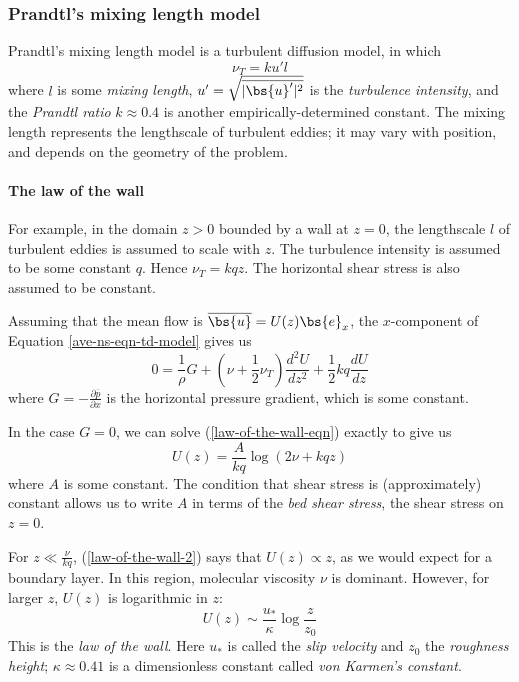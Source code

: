 \subsubsection{Prandtl's mixing length model}

Prandtl's mixing length model is a turbulent diffusion model, in which
\begin{equation}
    \nu_T = k u' l
\end{equation}
where $l$ is some \textit{mixing length}, $u'=\sqrt{\overline{|\bs{u}'|^2}}$
is the \textit{turbulence intensity}, and the \textit{Prandtl ratio}
$k\approx0.4$ is another empirically-determined constant. The mixing length
represents the lengthscale of turbulent eddies; it may vary with position, and
depends on the geometry of the problem. 

\paragraph{The law of the wall} For example, in the domain $z>0$ bounded by a
wall at $z=0$, the lengthscale $l$ of turbulent eddies is assumed to scale with
$z$. The turbulence intensity is assumed to be some constant $q$. Hence $\nu_T =
kqz$.  The horizontal shear stress is also assumed to be constant. 

Assuming that the mean flow is $\overline{\bs{u}} = U(z) \bs{e}_x$, the
$x$-component of Equation \ref{ave-ns-eqn-td-model} gives us
\begin{equation}
    0 = \frac{1}{\rho} G
    + \left(\nu+\frac{1}{2}\nu_T\right)\frac{d^2U}{dz^2}
    + \frac{1}{2}kq \frac{dU}{dz}
    \label{law-of-the-wall-eqn}
\end{equation}
where $G = -\frac{\partial\overline{p}}{\partial x}$ is the horizontal pressure
gradient, which is some constant. 

In the case $G=0$, we can solve (\ref{law-of-the-wall-eqn}) exactly to give us
\begin{equation}
    U(z) = \frac{A}{kq} \log(2\nu + kqz)
    \label{law-of-the-wall-2}
\end{equation}
where $A$ is some constant. The condition that shear stress is (approximately)
constant allows us to write $A$ in terms of the \textit{bed shear stress}, the
shear stress on $z=0$.

For $z\ll\frac{\nu}{kq}$, (\ref{law-of-the-wall-2}) says that $U(z)\propto z$,
as we would expect for a boundary layer. In this region, molecular viscosity
$\nu$ is dominant. However, for larger $z$, $U(z)$ is logarithmic in $z$:
\begin{equation}
    U(z) \sim \frac{u_*}{\kappa} \log\frac{z}{z_0}
    \label{law-of-the-wall}
\end{equation}
This is the \textit{law of the wall}. Here $u_*$ is called the \textit{slip
velocity} and $z_0$ the \textit{roughness height}; $\kappa\approx0.41$ is a
dimensionless constant called \textit{von Karmen's constant}. 

